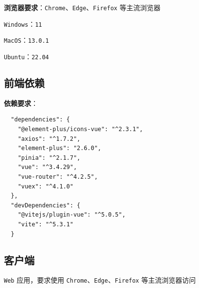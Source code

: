 \documentclass[12pt,a4paper,UTF8]{article}
\begin{document}
\textbf{浏览器要求}：\verb|Chrome|、\verb|Edge|、\verb|Firefox| 等主流浏览器

\verb|Windows|：\verb|11|

\verb|MacOS|：\verb|13.0.1|

\verb|Ubuntu|：\verb|22.04|

\subsection{前端依赖}

\textbf{依赖要求}：

\begin{lstlisting}
  "dependencies": {
    "@element-plus/icons-vue": "^2.3.1",
    "axios": "^1.7.2",
    "element-plus": "2.6.0",
    "pinia": "^2.1.7",
    "vue": "^3.4.29",
    "vue-router": "^4.2.5",
    "vuex": "^4.1.0"
  },
  "devDependencies": {
    "@vitejs/plugin-vue": "^5.0.5",
    "vite": "^5.3.1"
  }
\end{lstlisting}

\subsection{客户端}

\verb|Web| 应用，要求使用 \verb|Chrome|、\verb|Edge|、\verb|Firefox| 等主流浏览器访问



\end{document}
